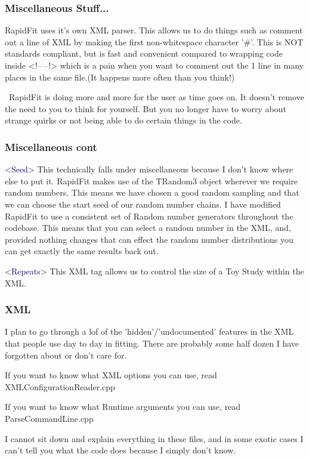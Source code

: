 \documentclass{beamer}
\begin{document}
\begin{frame}
\frametitle{Miscellaneous Stuff...}
RapidFit uses it's own XML parser.\newline
This allows us to do things such as comment out a line of XML by making the first non-whitespace character '\#'.\newline
This is NOT standards compliant, but is fast and convenient compared to wrapping code inside <!-- --!> which is a pain when you want to comment out the 1 line in many places in the same file.\newline (It happens more often than you think!)\newline\newline

\normalsize~RapidFit is doing more and more for the user as time goes on. It doesn't remove the need to you to think for yourself. But you no longer have to worry about strange quirks or not being able to do certain things in the code.

\end{frame}

\begin{frame}
\frametitle{Miscellaneous cont}
<\textcolor{darkblue}{Seed}>\newline
This technically falls under miscellaneous because I don't know where else to put it.\newline
RapidFit makes use of the TRandom3 object wherever we require random numbers. This means we have chosen a good random sampling and that we can choose the start seed of our random number chains.\newline
I have modified RapidFit to use a consistent set of Random number generators throughout the codebase. This means that you can select a random number in the XML, and, provided nothing changes that can effect the random number distributions you can get exactly the same results back out.\newline

<\textcolor{darkblue}{Repeats}>\newline
This XML tag allows us to control the size of a Toy Study within the XML.

\end{frame}


\begin{frame}
\frametitle{XML}
I plan to go through a lof of the 'hidden'/'undocumented' features in the XML that people use day to day in fitting. There are probably some half dozen I have forgotten about or don't care for.\newline

If you want to know what XML options you can use, read XMLConfigurationReader.cpp\newline

If you want to know what Runtime arguments you can use, read ParseCommandLine.cpp\newline

I cannot sit down and explain everything in these files, and in some exotic cases I can't tell you what the code does because I simply don't know.

\end{frame}
\end{document}
